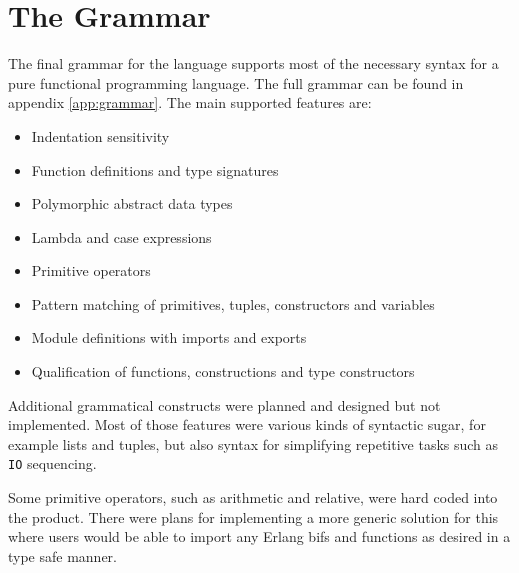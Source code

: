 \section{The Grammar}

The final grammar for the language supports most of the necessary syntax for a pure functional programming language.  The full grammar can be found in appendix \ref{app:grammar}. The main supported features are:

\begin{itemize}
  \item Indentation sensitivity
  \item Function definitions and type signatures
  \item Polymorphic abstract data types
  \item Lambda and case expressions
  \item Primitive operators
  \item Pattern matching of primitives, tuples, constructors and variables
  \item Module definitions with imports and exports
  \item Qualification of functions, constructions and type constructors
\end{itemize}

Additional grammatical constructs were planned and designed but not implemented. Most of those features were various kinds of syntactic sugar, for example lists and tuples, but also syntax for simplifying repetitive tasks such as \texttt{IO} sequencing.

Some primitive operators, such as arithmetic and relative, were hard coded into the product. There were plans for implementing a more generic solution for this where users would be able to import any Erlang \glspl{bif} and functions as desired in a type safe manner.
